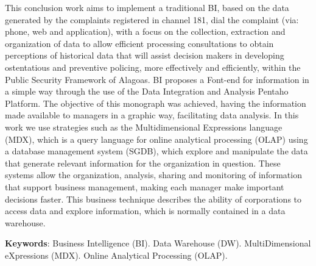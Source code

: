 %
%

\begin{ABSTRACT}
	\begin{SingleSpace}
	
		\hspace{-1.3 cm}This conclusion work aims to implement a traditional BI, based on the data generated by the complaints registered in channel 181, dial the complaint (via: phone, web and application), with a focus on the collection, extraction and organization of data to allow efficient processing consultations to obtain perceptions of historical data that will assist decision makers in developing ostentatious and preventive policing, more effectively and efficiently, within the Public Security Framework of Alagoas. BI proposes a Font-end for information in a simple way through the use of the Data Integration and Analysis Pentaho Platform. The objective of this monograph was achieved, having the information made available to managers in a graphic way, facilitating data analysis. In this work we use strategies such as the Multidimensional Expressions language (MDX), which is a query language for online analytical processing (OLAP) using a database management system (SGDB), which explore and manipulate the data that generate relevant information for the organization in question. These systems allow the organization, analysis, sharing and monitoring of information that support business management, making each manager make important decisions faster. This business technique describes the ability of corporations to access data and explore information, which is normally contained in a data warehouse.


		\vspace*{0.5cm}\hspace{-1.3 cm}\textbf{Keywords}: Business Intelligence (BI). Data Warehouse (DW). MultiDimensional eXpressions (MDX). Online Analytical Processing (OLAP).
		
		
	\end{SingleSpace}

\end{ABSTRACT}
